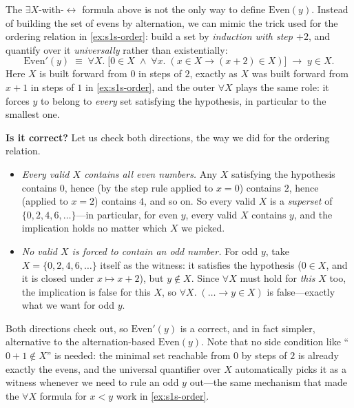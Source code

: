\begin{example}
\label{ex:s1s-parity-alt}
The $\exists X$-with-$\leftrightarrow$ formula above is not the only way
to define $\mathrm{Even}(y)$. Instead of building the set of evens by
alternation, we can mimic the trick used for the ordering relation in
\cref{ex:s1s-order}: build a set by \emph{induction with step $+2$},
and quantify over it \emph{universally} rather than existentially:
\[
  \mathrm{Even}'(y) \;\equiv\; \forall X.\;
  \bigl[0 \in X \;\land\; \forall x.\;(x \in X \to (x+2) \in X)\bigr]
  \;\to\; y \in X.
\]
Here $X$ is built forward from $0$ in steps of $2$, exactly as $X$ was
built forward from $x+1$ in steps of $1$ in \cref{ex:s1s-order}, and the
outer $\forall X$ plays the same role: it forces $y$ to belong to
\emph{every} set satisfying the hypothesis, in particular to the
smallest one.

\medskip\noindent
\textbf{Is it correct?} Let us check both directions, the way we did
for the ordering relation.
\begin{itemize}
  \item \emph{Every valid $X$ contains all even numbers.} Any $X$
        satisfying the hypothesis contains $0$, hence (by the step rule
        applied to $x=0$) contains $2$, hence (applied to $x=2$)
        contains $4$, and so on. So every valid $X$ is a
        \emph{superset} of $\{0, 2, 4, 6, \ldots\}$---in particular, for
        even $y$, every valid $X$ contains $y$, and the implication
        holds no matter which $X$ we picked.
  \item \emph{No valid $X$ is forced to contain an odd number.} For odd
        $y$, take $X = \{0, 2, 4, 6, \ldots\}$ itself as the witness: it
        satisfies the hypothesis ($0 \in X$, and it is closed under
        $x \mapsto x+2$), but $y \notin X$. Since $\forall X$ must hold
        for \emph{this} $X$ too, the implication is false for this $X$,
        so $\forall X.\;(\ldots \to y \in X)$ is false---exactly what we
        want for odd $y$.
\end{itemize}
Both directions check out, so $\mathrm{Even}'(y)$ is a correct, and
in fact simpler, alternative to the alternation-based
$\mathrm{Even}(y)$. Note that no side condition like ``$0+1 \notin X$''
is needed: the minimal set reachable from $0$ by steps of $2$ is already
exactly the evens, and the universal quantifier over $X$ automatically
picks it as a witness whenever we need to rule an odd $y$ out---the same
mechanism that made the $\forall X$ formula for $x < y$ work in
\cref{ex:s1s-order}.
\end{example}

